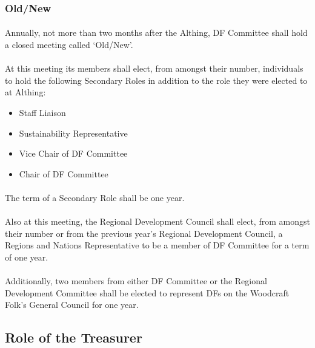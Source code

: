 \documentclass[a4paper, 12pt]{article}
\begin{document}
\subsubsection{Old/New}
\label{sec:oldnew}
\paragraph{} Annually, not more than two months after the Althing, DF Committee shall hold a closed meeting called `Old/New'.
\paragraph{} At this meeting its members shall elect, from amongst their number, individuals to hold the following Secondary Roles in addition to the role they were elected to at Althing:
\begin{itemize}
\item Staff Liaison
\item Sustainability Representative
\item Vice Chair of DF Committee
\item Chair of DF Committee
\end{itemize}

\paragraph{} The term of a Secondary Role shall be one year.

\paragraph{} \label{par:regionsandnationsrep} Also at this meeting, the Regional Development Council shall elect, from amongst their number or from the previous year's Regional Development Council, a Regions and Nations Representative to be a member of DF Committee for a term of one year.

\paragraph{} Additionally, two members from either DF Committee or the Regional Development Committee shall be elected to represent DFs on the Woodcraft Folk's General Council for one year.

\subsection{Role of the Treasurer}
\label{sec:treasurerrole}
\end{document}
